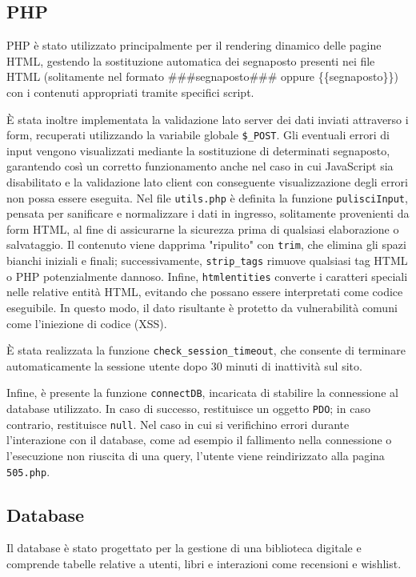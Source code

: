 \documentclass{article}
\begin{document}
\subsection{PHP}

PHP è stato utilizzato principalmente per il rendering dinamico delle pagine HTML, gestendo la sostituzione automatica dei segnaposto presenti nei file HTML (solitamente nel formato \#\#\#segnaposto\#\#\# oppure \{\{segnaposto\}\}) con i contenuti appropriati tramite specifici script.

È stata inoltre implementata la validazione lato server dei dati inviati attraverso i form, recuperati utilizzando la variabile globale \texttt{\$\_POST}. Gli eventuali errori di input vengono visualizzati mediante la sostituzione di determinati segnaposto, garantendo così un corretto funzionamento anche nel caso in cui JavaScript sia disabilitato e la validazione lato client con conseguente visualizzazione degli errori non possa essere eseguita.
Nel file \texttt{utils.php} è definita la funzione \texttt{pulisciInput}, pensata per sanificare e normalizzare i dati in ingresso, solitamente provenienti da form HTML, al fine di assicurarne la sicurezza prima di qualsiasi elaborazione o salvataggio.
Il contenuto viene dapprima "ripulito" con \texttt{trim}, che elimina gli spazi bianchi iniziali e finali; successivamente, \texttt{strip\_tags} rimuove qualsiasi tag HTML o PHP potenzialmente dannoso.
Infine, \texttt{htmlentities} converte i caratteri speciali nelle relative entità HTML, evitando che possano essere interpretati come codice eseguibile.
In questo modo, il dato risultante è protetto da vulnerabilità comuni come l'iniezione di codice (XSS).

È stata realizzata la funzione \texttt{check\_session\_timeout}, che consente di terminare automaticamente la sessione utente dopo 30 minuti di inattività sul sito.

Infine, è presente la funzione \texttt{connectDB}, incaricata di stabilire la connessione al database utilizzato. In caso di successo, restituisce un oggetto \texttt{PDO}; in caso contrario, restituisce \texttt{null}.
Nel caso in cui si verifichino errori durante l'interazione con il database, come ad esempio il fallimento nella connessione o l'esecuzione non riuscita di una query, l'utente viene reindirizzato alla pagina \texttt{505.php}.
\subsection{Database}
Il database è stato progettato per la gestione di una biblioteca digitale e comprende tabelle relative a utenti, libri e interazioni come recensioni e wishlist.
\end{document}
